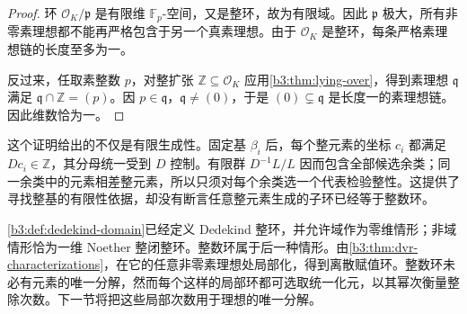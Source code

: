 \begin{proof}
	环 \(\mathcal O_K/\mathfrak p\) 是有限维 \(\mathbb F_p\)-空间，又是整环，故为有限域。因此 \(\mathfrak p\) 极大，所有非零素理想都不能再严格包含于另一个真素理想。由于 \(\mathcal O_K\) 是整环，每条严格素理想链的长度至多为一。

	反过来，任取素整数 \(p\)，对整扩张 \(\mathbb Z\subseteq\mathcal O_K\) 应用\cref{b3:thm:lying-over}，得到素理想 \(\mathfrak q\) 满足 \(\mathfrak q\cap\mathbb Z=(p)\)。因 \(p\in\mathfrak q\)，\(\mathfrak q\ne(0)\)，于是 \((0)\subsetneq\mathfrak q\) 是长度一的素理想链。因此维数恰为一。
\end{proof}

这个证明给出的不仅是有限生成性。固定基 \(\beta_i\) 后，每个整元素的坐标 \(c_i\) 都满足 \(Dc_i\in\mathbb Z\)，其分母统一受到 \(D\) 控制。有限群 \(D^{-1}L/L\) 因而包含全部候选余类；同一余类中的元素相差整元素，所以只须对每个余类选一个代表检验整性。这提供了寻找整基的有限性依据，却没有断言任意整元素生成的子环已经等于整数环。

\ProseParagraphBreak
\cref{b3:def:dedekind-domain}已经定义 Dedekind 整环，并允许域作为零维情形；非域情形恰为一维 Noether 整闭整环。整数环属于后一种情形。由\cref{b3:thm:dvr-characterizations}，在它的任意非零素理想处局部化，得到离散赋值环。整数环未必有元素的唯一分解，然而每个这样的局部环都可选取统一化元，以其幂次衡量整除次数。下一节将把这些局部次数用于理想的唯一分解。
